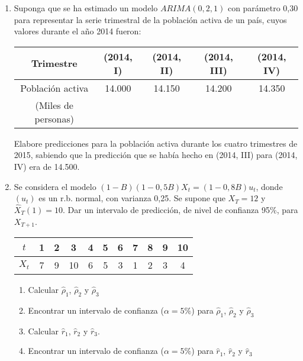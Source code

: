 \begin{enumerate}
\item Suponga que se ha estimado un modelo $ARIMA (0, 2, 1)$ con par\'{a}metro 0,30 para representar la serie trimestral de la poblaci\'{o}n activa de un pa\'{i}s, cuyos valores durante el a\~{n}o 2014 fueron:

\begin{center}
\begin{tabular}{@{}ccccc@{}}
\toprule
\textbf{Trimestre} & 
\textbf{(2014, I)}& 
\textbf{(2014, II)}& 
\textbf{(2014, III)}& 
\textbf{(2014, IV)} \\
\midrule
Poblaci\'{o}n activa & 14.000& 14.150& 14.200& 14.350 \\
(Miles de personas)& \\
\bottomrule
\end{tabular}
\end{center}

Elabore predicciones para la poblaci\'{o}n activa durante los cuatro trimestres de 2015, sabiendo que la predicci\'{o}n que se hab\'{i}a hecho en (2014, III) para (2014, IV) era de 14.500.

\item Se considera el modelo $(1-B) (1-0,5B) X_{t}=(1-0,8B) u_{t}$, donde $(u_{t})$ es un r.b. normal, con varianza 0,25. Se supone que $X_{T} =12$ y $\widehat{X}_{T} (1)=10$. Dar un intervalo de predicci\'{o}n, de nivel de confianza 95{\%}, para $X_{T+1} $.

\begin{center}
\begin{tabular}{@{}ccccccccccc@{}}
\toprule
$t$& 1& 2& 3& 4& 5& 6& 7& 8& 9& 10 \\
\midrule
$X_{t}$& 7& 9& 10& 6& 5& 3& 1& 2& 3& 4 \\
\bottomrule
\end{tabular}
\end{center}

\begin{enumerate}
 \item Calcular $\widehat{\rho}_{1}$, $\widehat{\rho}_{2}$ y $\widehat{\rho}_{3}$
\item Encontrar un intervalo de confianza ($\alpha =5\%$) para $\widehat{\rho}_{1}$, $\widehat{\rho}_{2}$ y $\widehat{\rho}_{3}$
\item Calcular $\widehat{r}_{1}$, $\widehat{r}_{2}$ y $\widehat{r}_{3}$.
\item Encontrar un intervalo de confianza ($\alpha =5\%$) para $\widehat{r}_{1}$, $\widehat{r}_{2}$ y $\widehat{r}_{3}$
\end{enumerate}


\end{enumerate}
